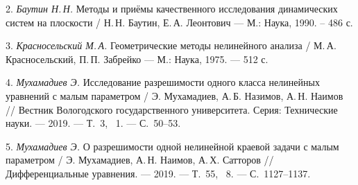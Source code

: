 2. {\it Баутин Н.\,Н. }
Методы и приёмы качественного исследования динамических систем на
плоскости / Н.\,Н. Баутин, Е.\,А. Леонтович --- М.: Наука, 1990.
-- 486 с.

3. {\it Красносельский М.\,А. }
Геометрические методы нелинейного анализа / М.\,А. Красносельский,
П.\,П. Забрейко --- М.: Наука, 1975. --- 512 с.

4. {\it Мухамадиев Э. }
Исследование разрешимости одного класса нелинейных уравнений с
малым параметром  / Э. Мухамадиев, А.\,Б. Назимов, А.\,Н. Наимов
// Вестник Вологодского государственного университета. Серия:
Технические науки. --- 2019. --- Т.~3, \No~1. --- С.~50--53.

5. {\it Мухамадиев Э. }
О разрешимости одной нелинейной краевой задачи с малым параметром
/ Э. Мухамадиев, А.\,Н. Наимов, А.\,Х. Сатторов
// Дифференциальные уравнения. --- 2019. --- Т.~55, \No~8. --- С.~1127--1137.

